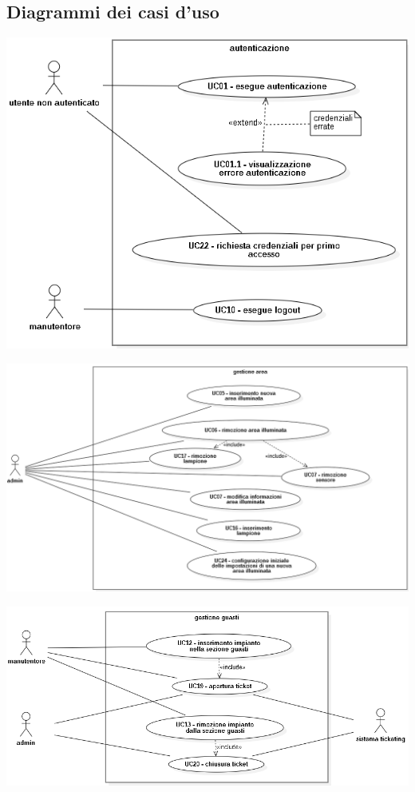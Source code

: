 \documentclass[12pt]{article}
\begin{document}
\subsection{Diagrammi dei casi d'uso}

\includegraphics[scale=0.5]{autenticazione.png}

\includegraphics[scale=0.5]{gestione area.png}	

\includegraphics[scale=0.5]{gestione guasti.png}	
\end{document}
